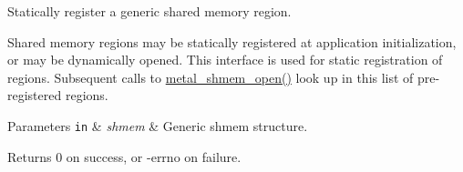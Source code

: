Statically register a generic shared memory region. 

Shared memory regions may be statically registered at application initialization, or may be dynamically opened. This interface is used for static registration of regions. Subsequent calls to \hyperlink{group__shmem_ga644f75b3abb4214f10db5384991bd052}{metal\+\_\+shmem\+\_\+open()} look up in this list of pre-\/registered regions.


\begin{DoxyParams}[1]{Parameters}
\mbox{\tt in}  & {\em shmem} & Generic shmem structure. \\
\hline
\end{DoxyParams}
\begin{DoxyReturn}{Returns}
0 on success, or -\/errno on failure. 
\end{DoxyReturn}
